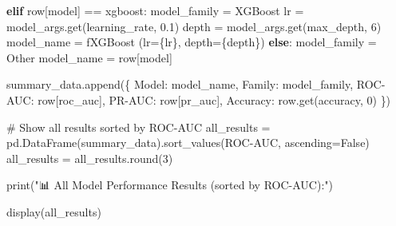 \documentclass[
  letterpaper,
  DIV=11,
  numbers=noendperiod]{scrartcl}
\newenvironment{Shaded}{\begin{snugshade}}{\end{snugshade}}
\newcommand{\BuiltInTok}[1]{\textcolor[rgb]{0.00,0.23,0.31}{#1}}
\newcommand{\CommentTok}[1]{\textcolor[rgb]{0.37,0.37,0.37}{#1}}
\newcommand{\ControlFlowTok}[1]{\textcolor[rgb]{0.00,0.23,0.31}{\textbf{#1}}}
\newcommand{\DecValTok}[1]{\textcolor[rgb]{0.68,0.00,0.00}{#1}}
\newcommand{\FloatTok}[1]{\textcolor[rgb]{0.68,0.00,0.00}{#1}}
\newcommand{\NormalTok}[1]{\textcolor[rgb]{0.00,0.23,0.31}{#1}}
\newcommand{\OperatorTok}[1]{\textcolor[rgb]{0.37,0.37,0.37}{#1}}
\newcommand{\SpecialCharTok}[1]{\textcolor[rgb]{0.37,0.37,0.37}{#1}}
\newcommand{\SpecialStringTok}[1]{\textcolor[rgb]{0.13,0.47,0.30}{#1}}
\newcommand{\StringTok}[1]{\textcolor[rgb]{0.13,0.47,0.30}{#1}}
\newcommand{\VariableTok}[1]{\textcolor[rgb]{0.07,0.07,0.07}{#1}}
\renewenvironment{Shaded}{%
  \begin{tcolorbox}[%
    enhanced,%
    colback=codebg,%
    colframe=codebg,%
    borderline west={3pt}{0pt}{sectionblue},%
    fontupper=\small\ttfamily,%
    boxrule=0pt,%
    arc=0pt,%
    boxsep=5pt,%
    left=2mm,%
    right=2mm,%
    top=2mm,%
    bottom=2mm%
  ]%
}{%
  \end{tcolorbox}%
}
\begin{document}
\begin{Shaded}
\begin{Highlighting}[]
    \ControlFlowTok{elif}\NormalTok{ row[}\StringTok{\textquotesingle{}model\textquotesingle{}}\NormalTok{] }\OperatorTok{==} \StringTok{\textquotesingle{}xgboost\textquotesingle{}}\NormalTok{:}
\NormalTok{        model\_family }\OperatorTok{=} \StringTok{\textquotesingle{}XGBoost\textquotesingle{}}
\NormalTok{        lr }\OperatorTok{=}\NormalTok{ model\_args.get(}\StringTok{\textquotesingle{}learning\_rate\textquotesingle{}}\NormalTok{, }\FloatTok{0.1}\NormalTok{)}
\NormalTok{        depth }\OperatorTok{=}\NormalTok{ model\_args.get(}\StringTok{\textquotesingle{}max\_depth\textquotesingle{}}\NormalTok{, }\DecValTok{6}\NormalTok{)}
\NormalTok{        model\_name }\OperatorTok{=} \SpecialStringTok{f\textquotesingle{}XGBoost (lr=}\SpecialCharTok{\{}\NormalTok{lr}\SpecialCharTok{\}}\SpecialStringTok{, depth=}\SpecialCharTok{\{}\NormalTok{depth}\SpecialCharTok{\}}\SpecialStringTok{)\textquotesingle{}}
    \ControlFlowTok{else}\NormalTok{:}
\NormalTok{        model\_family }\OperatorTok{=} \StringTok{\textquotesingle{}Other\textquotesingle{}}
\NormalTok{        model\_name }\OperatorTok{=}\NormalTok{ row[}\StringTok{\textquotesingle{}model\textquotesingle{}}\NormalTok{]}

\NormalTok{    summary\_data.append(\{}
        \StringTok{\textquotesingle{}Model\textquotesingle{}}\NormalTok{: model\_name,}
        \StringTok{\textquotesingle{}Family\textquotesingle{}}\NormalTok{: model\_family,}
        \StringTok{\textquotesingle{}ROC{-}AUC\textquotesingle{}}\NormalTok{: row[}\StringTok{\textquotesingle{}roc\_auc\textquotesingle{}}\NormalTok{],}
        \StringTok{\textquotesingle{}PR{-}AUC\textquotesingle{}}\NormalTok{: row[}\StringTok{\textquotesingle{}pr\_auc\textquotesingle{}}\NormalTok{],}
        \StringTok{\textquotesingle{}Accuracy\textquotesingle{}}\NormalTok{: row.get(}\StringTok{\textquotesingle{}accuracy\textquotesingle{}}\NormalTok{, }\DecValTok{0}\NormalTok{)}
\NormalTok{    \})}
\end{Highlighting}
\end{Shaded}

\begin{Shaded}
\begin{Highlighting}[]
\CommentTok{\# Show all results sorted by ROC{-}AUC}
\NormalTok{all\_results }\OperatorTok{=}\NormalTok{ pd.DataFrame(summary\_data).sort\_values(}\StringTok{\textquotesingle{}ROC{-}AUC\textquotesingle{}}\NormalTok{, ascending}\OperatorTok{=}\VariableTok{False}\NormalTok{)}
\NormalTok{all\_results }\OperatorTok{=}\NormalTok{ all\_results.}\BuiltInTok{round}\NormalTok{(}\DecValTok{3}\NormalTok{)}


\BuiltInTok{print}\NormalTok{(}\StringTok{"📊 All Model Performance Results (sorted by ROC{-}AUC):"}\NormalTok{)}


\NormalTok{display(all\_results)}

\end{Highlighting}
\end{Shaded}
\end{document}
